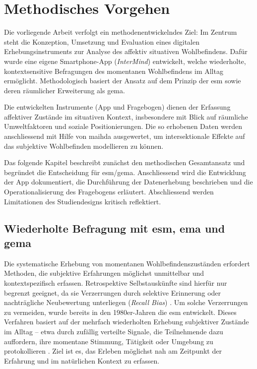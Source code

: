 
\section{Methodisches Vorgehen} \label{sec:methodik}

Die vorliegende Arbeit verfolgt ein methodenentwickelndes Ziel: Im Zentrum steht die Konzeption, Umsetzung und Evaluation eines digitalen Erhebungsinstruments zur Analyse des affektiv situativen Wohlbefindens. Dafür wurde eine eigene Smartphone-App (\textit{InterMind}) entwickelt, welche wiederholte, kontextsensitive Befragungen des momentanen Wohlbefindens im Alltag ermöglicht. Methodologisch basiert der Ansatz auf dem Prinzip der \acrfull{esm} sowie deren räumlicher Erweiterung als \acrfull{gema}.

Die entwickelten Instrumente (App und Fragebogen) dienen der Erfassung affektiver Zustände im situativen Kontext, insbesondere mit Blick auf räumliche Umweltfaktoren und soziale Positionierungen. Die so erhobenen Daten werden anschliessend mit Hilfe von \acrfull{maihda} ausgewertet, um intersektionale Effekte auf das subjektive Wohlbefinden modellieren zu können.

Das folgende Kapitel beschreibt zunächst den methodischen Gesamtansatz und begründet die Entscheidung für \acrshort{esm}/\acrshort{gema}. Anschliessend wird die Entwicklung der App dokumentiert, die Durchführung der Datenerhebung beschrieben und die Operationalisierung des Fragebogens erläutert. Abschliessend werden Limitationen des Studiendesigns kritisch reflektiert.


\subsection{Wiederholte Befragung mit \acrshort{esm}, \acrshort{ema} und \acrshort{gema}}

Die systematische Erhebung von momentanen Wohlbefindenszuständen erfordert Methoden, die subjektive Erfahrungen möglichst unmittelbar und kontextspezifisch erfassen. Retrospektive Selbstauskünfte sind hierfür nur begrenzt geeignet, da sie Verzerrungen durch selektive Erinnerung oder nachträgliche Neubewertung unterliegen (\textit{Recall Bias}) \parencite{kahnemanDevelopmentsMeasurementSubjective2006}. Um solche Verzerrungen zu vermeiden, wurde bereits in den 1980er-Jahren die \acrfull{esm} entwickelt. Dieses Verfahren basiert auf der mehrfach wiederholten Erhebung subjektiver Zustände im Alltag – etwa durch zufällig verteilte Signale, die Teilnehmende dazu auffordern, ihre momentane Stimmung, Tätigkeit oder Umgebung zu protokollieren \parencite{csikszentmihalyiValidityReliabilityExperienceSampling1987}. Ziel ist es, das Erleben möglichst nah am Zeitpunkt der Erfahrung und im natürlichen Kontext zu erfassen.

